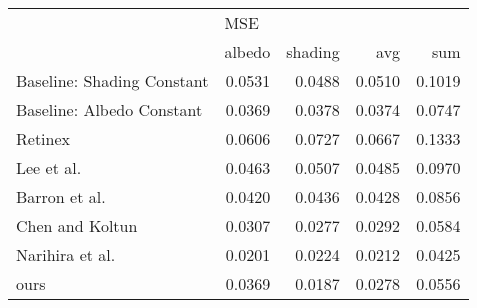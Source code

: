 \begin{tabular}{lrrrr}
\toprule
{} & \multicolumn{4}{l}{MSE} \\
{} &  albedo & shading &     avg &     sum \\
\midrule
Baseline: Shading Constant          &  0.0531 &  0.0488 &  0.0510 &  0.1019 \\
Baseline: Albedo Constant           &  0.0369 &  0.0378 &  0.0374 &  0.0747 \\
Retinex \cite{grosse2009}           &  0.0606 &  0.0727 &  0.0667 &  0.1333 \\
Lee et al. \cite{lee2012}           &  0.0463 &  0.0507 &  0.0485 &  0.0970 \\
Barron et al. \cite{barron2015}     &  0.0420 &  0.0436 &  0.0428 &  0.0856 \\
Chen and Koltun \cite{chen2013}     &  0.0307 &  0.0277 &  0.0292 &  0.0584 \\
Narihira et al. \cite{narihira2015} &  0.0201 &  0.0224 &  0.0212 &  0.0425 \\
ours                                &  0.0369 &  0.0187 &  0.0278 &  0.0556 \\
\bottomrule
\end{tabular}

